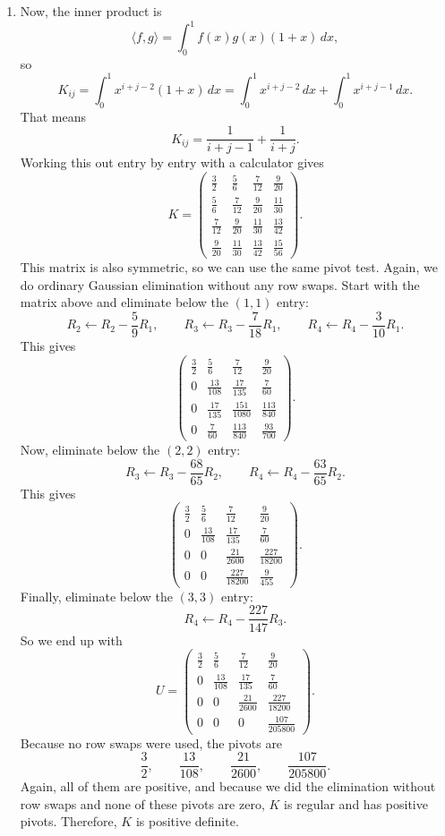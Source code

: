 \documentclass[10pt]{extarticle}
\begin{document}
\begin{enumerate}[label=(\alph*)]
\item Now, the inner product is
\[
\langle f,g\rangle=\int_0^1f(x)g(x)(1+x)\,dx,
\]
so
\[
K_{ij}=\int_0^1 x^{i+j-2}(1+x)\,dx
=\int_0^1 x^{i+j-2}\,dx+\int_0^1 x^{i+j-1}\,dx.
\]
That means
\[
K_{ij}=\frac{1}{i+j-1}+\frac{1}{i+j}.
\]
Working this out entry by entry with a calculator gives
\[
K=
\begin{pmatrix}
\frac{3}{2} & \frac{5}{6} & \frac{7}{12} & \frac{9}{20}\\[0.5em]
\frac{5}{6} & \frac{7}{12} & \frac{9}{20} & \frac{11}{30}\\[0.5em]
\frac{7}{12} & \frac{9}{20} & \frac{11}{30} & \frac{13}{42}\\[0.5em]
\frac{9}{20} & \frac{11}{30} & \frac{13}{42} & \frac{15}{56}
\end{pmatrix}.
\]
This matrix is also symmetric, so we can use the same pivot test. Again, we do ordinary Gaussian elimination without any row swaps. Start with the matrix above and eliminate below the $(1,1)$ entry:
\[
R_2\leftarrow R_2-\frac{5}{9}R_1,
\qquad
R_3\leftarrow R_3-\frac{7}{18}R_1,
\qquad
R_4\leftarrow R_4-\frac{3}{10}R_1.
\]
This gives
\[
\begin{pmatrix}
\frac{3}{2} & \frac{5}{6} & \frac{7}{12} & \frac{9}{20}\\[0.5em]
0 & \frac{13}{108} & \frac{17}{135} & \frac{7}{60}\\[0.5em]
0 & \frac{17}{135} & \frac{151}{1080} & \frac{113}{840}\\[0.5em]
0 & \frac{7}{60} & \frac{113}{840} & \frac{93}{700}
\end{pmatrix}.
\]
Now, eliminate below the $(2,2)$ entry:
\[
R_3\leftarrow R_3-\frac{68}{65}R_2,
\qquad
R_4\leftarrow R_4-\frac{63}{65}R_2.
\]
This gives
\[
\begin{pmatrix}
\frac{3}{2} & \frac{5}{6} & \frac{7}{12} & \frac{9}{20}\\[0.5em]
0 & \frac{13}{108} & \frac{17}{135} & \frac{7}{60}\\[0.5em]
0 & 0 & \frac{21}{2600} & \frac{227}{18200}\\[0.5em]
0 & 0 & \frac{227}{18200} & \frac{9}{455}
\end{pmatrix}.
\]
Finally, eliminate below the $(3,3)$ entry:
\[
R_4\leftarrow R_4-\frac{227}{147}R_3.
\]
So we end up with
\[
U=
\begin{pmatrix}
\frac{3}{2} & \frac{5}{6} & \frac{7}{12} & \frac{9}{20}\\[0.5em]
0 & \frac{13}{108} & \frac{17}{135} & \frac{7}{60}\\[0.5em]
0 & 0 & \frac{21}{2600} & \frac{227}{18200}\\[0.5em]
0 & 0 & 0 & \frac{107}{205800}
\end{pmatrix}.
\]
Because no row swaps were used, the pivots are
\[
\frac{3}{2},\qquad \frac{13}{108},\qquad \frac{21}{2600},\qquad \frac{107}{205800}.
\]
Again, all of them are positive, and because we did the elimination without row swaps and none of these pivots are zero, $K$ is regular and has positive pivots. Therefore, $K$ is positive definite.
\end{enumerate}
\end{document}
